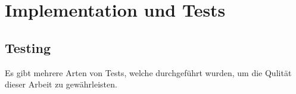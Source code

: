 \section{Implementation und Tests}

%


\subsection{Testing}
Es gibt mehrere Arten von Tests, welche durchgeführt wurden, um die Qulität dieser Arbeit zu gewährleisten.


